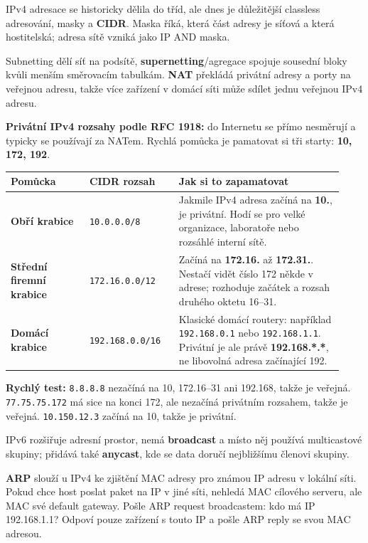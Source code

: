 \documentclass[11pt,a4paper]{article}
\newcommand{\itpr}[1]{\medskip\noindent\colorbox{green!8}{\parbox{\dimexpr\linewidth-2\fboxsep}{#1}}\medskip}
\newcommand{\itbox}[1]{\medskip\noindent\colorbox{black!6}{\parbox{\dimexpr\linewidth-2\fboxsep}{#1}}\medskip}
\begin{document}
IPv4 adresace se historicky dělila do tříd, ale dnes je důležitější classless adresování, masky a \textbf{CIDR}. Maska říká, která část adresy je síťová a která hostitelská; adresa sítě vzniká jako IP AND maska.

Subnetting dělí síť na podsítě, \textbf{supernetting}/agregace spojuje sousední bloky kvůli menším směrovacím tabulkám. \textbf{NAT} překládá privátní adresy a porty na veřejnou adresu, takže více zařízení v domácí síti může sdílet jednu veřejnou IPv4 adresu.

\itbox{\textbf{Privátní IPv4 rozsahy podle RFC 1918:} do Internetu se přímo nesměrují a typicky se používají za NATem. Rychlá pomůcka je pamatovat si tři starty: \textbf{10, 172, 192}.}

\begin{longtable}{p{0.22\linewidth}p{0.25\linewidth}p{0.46\linewidth}}
\toprule
\textbf{Pomůcka} & \textbf{CIDR rozsah} & \textbf{Jak si to zapamatovat} \\
\midrule\endhead
\textbf{Obří krabice} & \texttt{10.0.0.0/8} & Jakmile IPv4 adresa začíná na \textbf{10.}, je privátní. Hodí se pro velké organizace, laboratoře nebo rozsáhlé interní sítě. \\
\addlinespace
\textbf{Střední firemní krabice} & \texttt{172.16.0.0/12} & Začíná na \textbf{172.16.} až \textbf{172.31.}. Nestačí vidět číslo 172 někde v adrese; rozhoduje začátek a rozsah druhého oktetu 16--31. \\
\addlinespace
\textbf{Domácí krabice} & \texttt{192.168.0.0/16} & Klasické domácí routery: například \texttt{192.168.0.1} nebo \texttt{192.168.1.1}. Privátní je ale právě \textbf{192.168.*.*}, ne libovolná adresa začínající 192. \\
\bottomrule
\end{longtable}

\itpr{\textbf{Rychlý test:} \texttt{8.8.8.8} nezačíná na 10, 172.16--31 ani 192.168, takže je veřejná. \texttt{77.75.75.172} má sice na konci 172, ale nezačíná privátním rozsahem, takže je veřejná. \texttt{10.150.12.3} začíná na 10, takže je privátní.}

IPv6 rozšiřuje adresní prostor, nemá \textbf{broadcast} a místo něj používá multicastové skupiny; přidává také \textbf{anycast}, kde se data doručí nejbližšímu členovi skupiny.

\textbf{ARP} slouží u IPv4 ke zjištění MAC adresy pro známou IP adresu v lokální síti. Pokud chce host poslat paket na IP v jiné síti, nehledá MAC cílového serveru, ale MAC své default gateway. Pošle ARP request broadcastem: kdo má IP 192.168.1.1? Odpoví pouze zařízení s touto IP a pošle ARP reply se svou MAC adresou.
\end{document}
